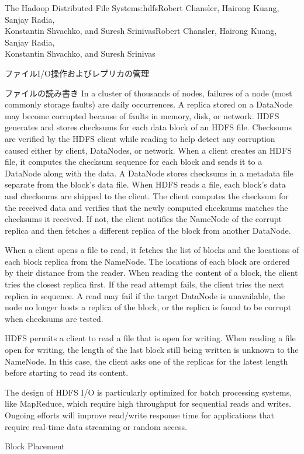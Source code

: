 \begin{aosachaptertoc}{The Hadoop Distributed File System}{s:hdfs}{Robert Chansler, Hairong Kuang, Sanjay Radia, \\ Konstantin Shvachko, and Suresh Srinivas}{Robert Chansler, Hairong Kuang, Sanjay Radia, \\ \hspace*{0.9cm} Konstantin Shvachko, and Suresh Srinivas}
\begin{aosasect1}{ファイルI/O操作およびレプリカの管理}
\begin{aosasect2}{ファイルの読み書き}
In a cluster of thousands of nodes, failures of a node (most commonly
storage faults) are daily occurrences. A replica stored on a DataNode
may become corrupted because of faults in memory, disk, or network.
HDFS generates and stores checksums for each data block of an HDFS
file. Checksums are verified by the HDFS client while reading to help
detect any corruption caused either by client, DataNodes, or
network. When a client creates an HDFS file, it computes the checksum
sequence for each block and sends it to a DataNode along with the
data. A DataNode stores checksums in a metadata file separate from the
block's data file. When HDFS reads a file, each block's data and
checksums are shipped to the client. The client computes the checksum
for the received data and verifies that the newly computed checksums
matches the checksums it received. If not, the client notifies the
NameNode of the corrupt replica and then fetches a different replica
of the block from another DataNode.

When a client opens a file to read, it fetches the list of blocks and
the locations of each block replica from the NameNode. The locations
of each block are ordered by their distance from the reader. When
reading the content of a block, the client tries the closest replica
first. If the read attempt fails, the client tries the next replica in
sequence. A read may fail if the target DataNode is unavailable, the
node no longer hosts a replica of the block, or the replica is found
to be corrupt when checksums are tested.

HDFS permits a client to read a file that is open for writing. When
reading a file open for writing, the length of the last block still
being written is unknown to the NameNode. In this case, the client
asks one of the replicas for the latest length before starting to read
its content.

The design of HDFS I/O is particularly optimized for batch processing
systems, like MapReduce, which require high throughput for sequential
reads and writes. Ongoing efforts will improve read/write response
time for applications that require real-time data streaming or random
access.

\end{aosasect2}

\begin{aosasect2}{Block Placement}


\end{aosasect2}
\end{aosasect1}
\end{aosachaptertoc}
